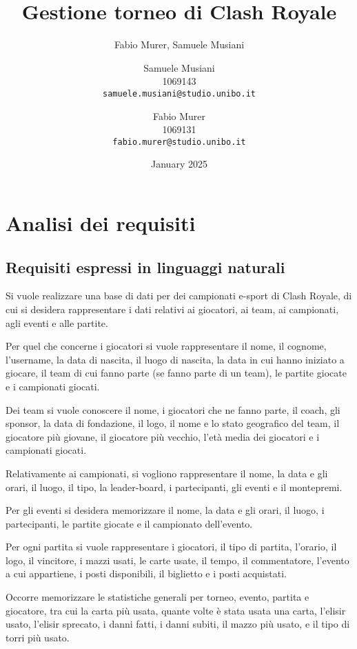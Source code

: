 \documentclass{article}
\title{\textbf{Gestione torneo di Clash Royale}}
\author{Fabio Murer, Samuele Musiani}
\author{
  Samuele Musiani \\
  1069143 \\
  \texttt{samuele.musiani@studio.unibo.it}
  \and
  Fabio Murer\\
  1069131\\
  \texttt{fabio.murer@studio.unibo.it}
}
\date{January 2025}
\begin{document}
\maketitle

\tableofcontents

\section{Analisi dei requisiti}

\subsection{Requisiti espressi in linguaggi naturali}
Si vuole realizzare una base di dati per dei campionati e-sport di Clash Royale, di cui si desidera rappresentare i dati relativi ai giocatori, ai team, ai campionati, agli eventi e alle partite.

Per quel che concerne i giocatori si vuole rappresentare il nome, il cognome, l'username, la data di nascita, il luogo di nascita, la data in cui hanno iniziato a giocare, il team di cui fanno parte (se fanno parte di un team), le partite giocate e i campionati giocati.

Dei team si vuole conoscere il nome, i giocatori che ne fanno parte, il coach, gli sponsor, la data di fondazione, il logo, il nome e lo stato geografico del team, il giocatore più giovane, il giocatore più vecchio, l'età media dei giocatori e i campionati giocati.

Relativamente ai campionati, si vogliono rappresentare il nome, la data e gli orari, il luogo, il tipo, la leader-board, i partecipanti, gli eventi e il montepremi.

Per gli eventi si desidera memorizzare il nome, la data e gli orari, il luogo, i partecipanti, le partite giocate e il campionato dell'evento.

Per ogni partita si vuole rappresentare i giocatori, il tipo di partita, l'orario, il logo, il vincitore, i mazzi usati, le carte usate, il tempo, il commentatore, l'evento a cui appartiene, i posti disponibili, il biglietto e i posti acquistati.

Occorre memorizzare le statistiche generali per torneo, evento, partita e giocatore, tra cui la carta più usata, quante volte è stata usata una carta, l'elisir usato, l'elisir sprecato, i danni fatti, i danni subiti, il mazzo più usato, e il tipo di torri più usato. 
\end{document}
